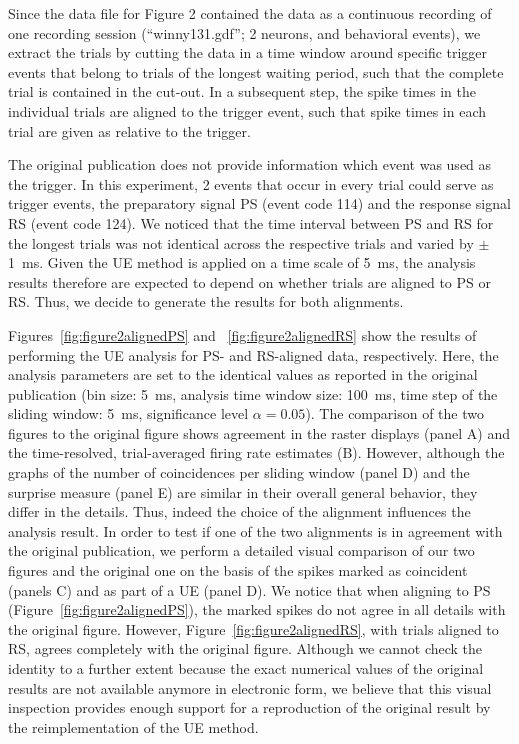 \documentclass[10pt,a4paper,onecolumn]{article}
\begin{document}
Since the data file for Figure 2 contained the data as a continuous
recording of one recording session (``winny131.gdf''; 2 neurons, and
behavioral events), we extract the trials by cutting the data in a time
window around specific trigger events that belong to trials of the
longest waiting period, such that the complete trial is contained in the
cut-out. In a subsequent step, the spike times in the individual trials
are aligned to the trigger event, such that spike times in each trial
are given as relative to the trigger.

The original publication does not provide information which event was
used as the trigger. In this experiment, 2 events that occur in every
trial could serve as trigger events, the preparatory signal PS (event
code 114) and the response signal RS (event code 124). We noticed that
the time interval between PS and RS for the longest trials was not
identical across the respective trials and varied by \(\pm\) 1~ms. Given
the UE method is applied on a time scale of 5~ms, the analysis results
therefore are expected to depend on whether trials are aligned to PS or
RS. Thus, we decide to generate the results for both alignments.

Figures~\ref{fig:figure2alignedPS} and ~\ref{fig:figure2alignedRS} show
the results of performing the UE analysis for PS- and RS-aligned data,
respectively. Here, the analysis parameters are set to the identical
values as reported in the original publication (bin size: 5~ms, analysis
time window size: 100~ms, time step of the sliding window: 5~ms,
significance level \(\alpha= 0.05\)). The comparison of the two figures
to the original figure shows agreement in the raster displays (panel A)
and the time-resolved, trial-averaged firing rate estimates (B).
However, although the graphs of the number of coincidences per sliding
window (panel D) and the surprise measure (panel E) are similar in their
overall general behavior, they differ in the details. Thus, indeed the
choice of the alignment influences the analysis result. In order to test
if one of the two alignments is in agreement with the original
publication, we perform a detailed visual comparison of our two figures
and the original one on the basis of the spikes marked as coincident
(panels C) and as part of a UE (panel D). We notice that when aligning
to PS (Figure~\ref{fig:figure2alignedPS}), the marked spikes do not
agree in all details with the original figure. However,
Figure~\ref{fig:figure2alignedRS}, with trials aligned to RS, agrees
completely with the original figure. Although we cannot check the
identity to a further extent because the exact numerical values of the
original results are not available anymore in electronic form, we
believe that this visual inspection provides enough support for a
reproduction of the original result by the reimplementation of the UE
method.
\end{document}

